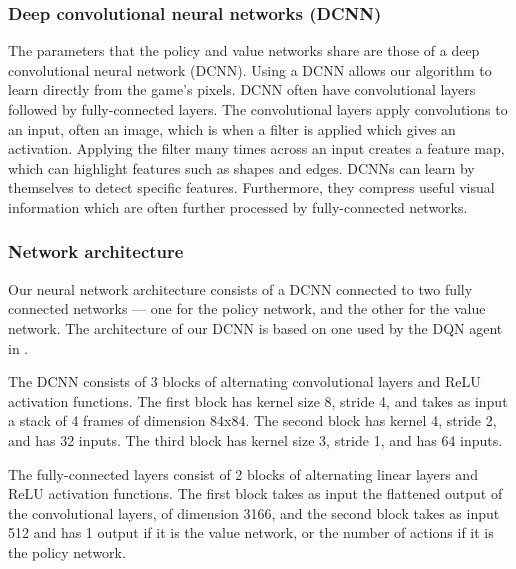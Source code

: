 \documentclass[12pt,a4paper]{article}
\begin{document}
\subsubsection{Deep convolutional neural networks (DCNN)}
The parameters that the policy and value networks share are those of a deep convolutional neural network (DCNN). Using a DCNN allows our algorithm to learn directly from the game's pixels. DCNN often have convolutional layers followed by fully-connected layers. The convolutional layers apply convolutions to an input, often an image, which is when a filter is applied which gives an activation. Applying the filter many times across an input creates a feature map, which can highlight features such as shapes and edges. DCNNs can learn by themselves to detect specific features. Furthermore, they compress useful visual information which are often further processed by fully-connected networks. 

\subsubsection{Network architecture}
Our neural network architecture consists of a DCNN connected to two fully connected networks --- one for the policy network, and the other for the value network. The architecture of our DCNN is based on one used by the DQN agent in \cite{Mnih2015}.

The DCNN consists of 3 blocks of alternating convolutional layers and ReLU activation functions. The first block has kernel size 8, stride 4, and takes as input a stack of 4 frames of dimension 84x84. The second block has kernel 4, stride 2, and has 32 inputs. The third block has kernel size 3, stride 1, and has 64 inputs. 

The fully-connected layers consist of 2 blocks of alternating linear layers and ReLU activation functions. The first block takes as input the flattened output of the convolutional layers, of dimension 3166, and the second block takes as input 512 and has 1 output if it is the value network, or the number of actions if it is the policy network. 

\begin{figure}[h]
    \centering
    \hfill
    \caption{}
\end{figure}
\end{document}
